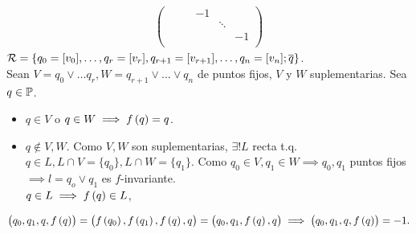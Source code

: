 \begin{obs}
\begin{gather*}
\begin{pmatrix}
            & & & -1 & & \\
            & & & & \ddots & \\
            & & & & & -1\\
        \end{pmatrix}
    \end{gather*}
    $\mathcal{R} = \{q_0 = [v_0], \dots, q_r=[v_r], q_{r+1} = [v_{r+1}], \dots, q_n = [v_n]; \overline{q}\}$.\\
    Sean $V = q_0 \vee \dots q_r, W = q_{r+1} \vee \dots \vee q_n$ de puntos fijos, $V$ y $W$ suplementarias.
    Sea $q \in \mathbb{P}$.
    \begin{itemize}
        \item $q \in V$ o $q \in W \implies f\left( q\right)=q$.
        \item $q \notin V, W$. Como $V,W$ son suplementarias, $\exists! L$ recta t.q. $q\in L, L\cap V=\{q_0\}, L\cap W = \{q_1\}$. Como $q_0\in V, q_1 \in W \implies q_0, q_1$ puntos fijos $\implies l = q_o \vee q_1$ es $f$-invariante. \\
        $q \in L \implies f\left( q\right) \in L$,
    \end{itemize}
    \[\left( q_0, q_1, q, f\left( q\right)\right) = \left( f\left( q_0\right), f\left( q_1\right), f\left( q\right), q\right) = \left( q_0, q_1, f\left( q\right), q\right) \implies \left( q_0, q_1, q, f\left( q\right)\right) = -1.\] %
\end{obs}
